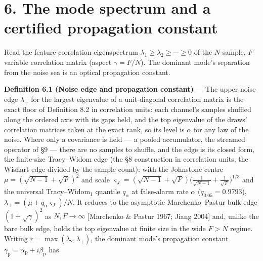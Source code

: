 \documentclass[10pt,letterpaper,twocolumn]{article}
\begin{document}
\section{6. The mode spectrum and a certified propagation constant}\label{6-the-mode-spectrum-and-a-certified-propagation-constant}

Read the feature-correlation eigenspectrum \(\lambda_1\ge\lambda_2\ge\cdots\ge0\) of the \(N\)-sample, \(F\)-variable correlation matrix (aspect \(\gamma=F/N\)). The dominant mode's separation from the noise sea is an optical propagation constant.

\textbf{Definition 6.1 (Noise edge and propagation constant)} --- The upper noise edge \(\lambda_+\) for the largest eigenvalue of a unit-diagonal correlation matrix is the exact floor of Definition 8.2 in correlation units: each channel's samples shuffled along the ordered axis with its gaps held, and the top eigenvalue of the draws' correlation matrices taken at the exact rank, so its level is \(\alpha\) for any law of the noise. Where only a covariance is held --- a pooled accumulator, the streamed operator of §9 --- there are no samples to shuffle, and the edge is its closed form, the finite-size Tracy--Widom edge (the §8 construction in correlation units, the Wishart edge divided by the sample count): with the Johnstone centre \(\mu=(\sqrt{N-1}+\sqrt F)^2\) and scale \(\varsigma_J=(\sqrt{N-1}+\sqrt F)\big(\tfrac1{\sqrt{N-1}}+\tfrac1{\sqrt F}\big)^{1/3}\) and the universal Tracy--Widom\(_1\) quantile \(q_\alpha\) at false-alarm rate \(\alpha\) (\(q_{0.05}=0.9793\)), \(\lambda_+=(\mu+q_\alpha\varsigma_J)/N\). It reduces to the asymptotic Marchenko--Pastur bulk edge \((1+\sqrt\gamma)^2\) as \(N,F\to\infty\) {[}Marchenko \& Pastur 1967; Jiang 2004{]} and, unlike the bare bulk edge, holds the top eigenvalue at finite size in the wide \(F>N\) regime. Writing \(r=\max(\lambda_2,\lambda_+)\), the dominant mode's propagation constant \(\gamma_{\mathrm p}=\alpha_{\mathrm p}+i\beta_{\mathrm p}\) has

\end{document}
